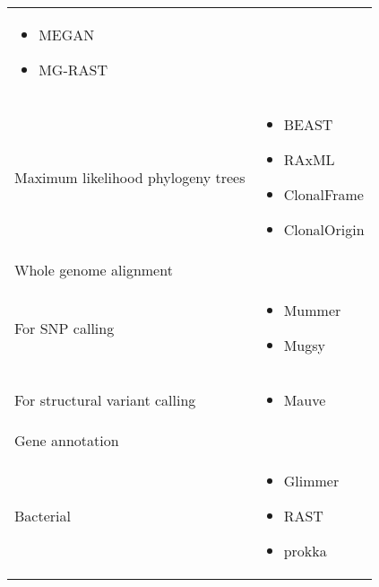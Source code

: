 \begin{table}[ht]
\begin{tabular}{l l}
    \begin{minipage}[t]{5cm}
      \raggedright
      \begin{itemize}[noitemsep]
      \item MEGAN
      \item MG-RAST
      \end{itemize}
      \smallskip
    \end{minipage}
    \\
    Maximum likelihood phylogeny trees &
    \begin{minipage}[t]{5cm}
      \raggedright
      \begin{itemize}[noitemsep]
      \item BEAST
      \item RAxML
      \item ClonalFrame
      \item ClonalOrigin
      \end{itemize}
      \smallskip
    \end{minipage}
    \\
    Whole genome alignment &
    \\
    \-\tabindent For SNP calling &
    \begin{minipage}[t]{5cm}
      \raggedright
      \begin{itemize}[noitemsep]
      \item Mummer
      \item Mugsy
      \end{itemize}
      \smallskip
    \end{minipage}
    \\
    \-\tabindent For structural variant calling &
    \begin{minipage}[t]{5cm}
      \raggedright
      \begin{itemize}[noitemsep]
      \item Mauve
      \end{itemize}
      \smallskip
    \end{minipage}
    \\
    Gene annotation &
    \\
    \-\tabindent Bacterial &
    \begin{minipage}[t]{5cm}
      \raggedright
      \begin{itemize}[noitemsep]
      \item Glimmer
      \item RAST
      \item prokka
      \end{itemize}

\end{minipage}
\end{tabular}
\end{table}
